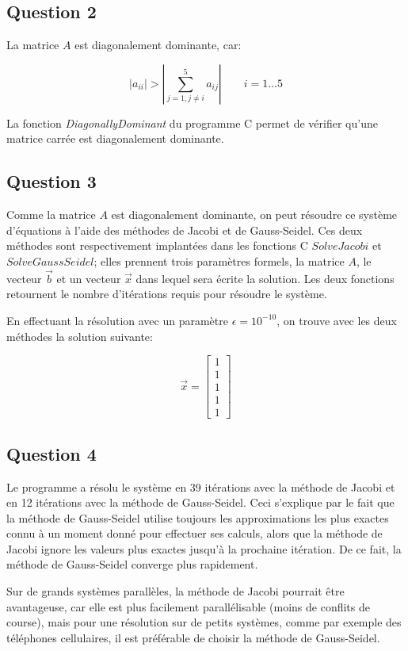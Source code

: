 \documentclass[10pt]{article}
\begin{document}
\subsection{Question 2}

La matrice $A$ est diagonalement dominante, car:

\[
|a_{ii}| > \left|\sum_{j=1, j \ne i}^5a_{ij}\right| \quad\quad i=1\ldots 5
\]

La fonction \emph{DiagonallyDominant} du programme C permet de
vérifier qu'une matrice carrée est diagonalement dominante.

\subsection{Question 3}

Comme la matrice $A$ est diagonalement dominante, on peut résoudre ce
système d'équations à l'aide des méthodes de Jacobi et de
Gauss-Seidel.  Ces deux méthodes sont respectivement implantées dans
les fonctions C $SolveJacobi$ et $SolveGaussSeidel$; elles prennent
trois paramètres formels, la matrice $A$, le vecteur $\vec{b}$ et un
vecteur $\vec{x}$ dans lequel sera écrite la solution.  Les deux
fonctions retournent le nombre d'itérations requis pour résoudre le
système.

En effectuant la résolution avec un paramètre $\epsilon = 10^{-10}$,
on trouve avec les deux méthodes la solution suivante:

\[
\vec{x} = \begin{bmatrix}
  1 \\ 1 \\ 1 \\ 1 \\ 1
\end{bmatrix}
\]


\subsection{Question 4}

Le programme a résolu le système en 39 itérations avec la méthode de
Jacobi et en 12 itérations avec la méthode de Gauss-Seidel.  Ceci
s'explique par le fait que la méthode de Gauss-Seidel utilise toujours
les approximations les plus exactes connu à un moment donné pour
effectuer ses calculs, alors que la méthode de Jacobi ignore les
valeurs plus exactes jusqu'à la prochaine itération. De ce fait, la
méthode de Gauss-Seidel converge plus rapidement.

Sur de grands systèmes parallèles, la méthode de Jacobi pourrait être
avantageuse, car elle est plus facilement parallélisable (moins de
conflits de course), mais pour une résolution sur de petits systèmes,
comme par exemple des téléphones cellulaires, il est préférable de
choisir la méthode de Gauss-Seidel.
\end{document}
